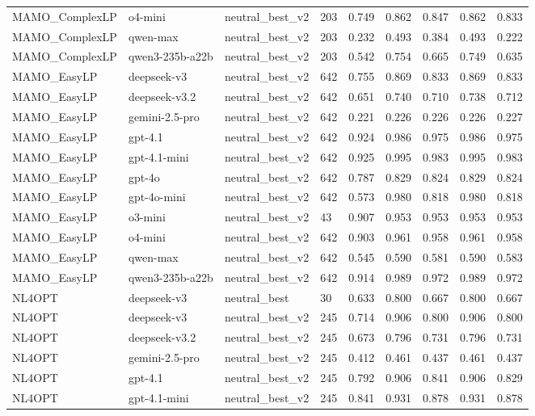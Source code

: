 \begin{table}[t]
\begin{tabular}{lllllllll}
MAMO\_ComplexLP & o4-mini & neutral\_best\_v2 & 203 & 0.749 & 0.862 & 0.847 & 0.862 & 0.833 \\
MAMO\_ComplexLP & qwen-max & neutral\_best\_v2 & 203 & 0.232 & 0.493 & 0.384 & 0.493 & 0.222 \\
MAMO\_ComplexLP & qwen3-235b-a22b & neutral\_best\_v2 & 203 & 0.542 & 0.754 & 0.665 & 0.749 & 0.635 \\
MAMO\_EasyLP & deepseek-v3 & neutral\_best\_v2 & 642 & 0.755 & 0.869 & 0.833 & 0.869 & 0.833 \\
MAMO\_EasyLP & deepseek-v3.2 & neutral\_best\_v2 & 642 & 0.651 & 0.740 & 0.710 & 0.738 & 0.712 \\
MAMO\_EasyLP & gemini-2.5-pro & neutral\_best\_v2 & 642 & 0.221 & 0.226 & 0.226 & 0.226 & 0.227 \\
MAMO\_EasyLP & gpt-4.1 & neutral\_best\_v2 & 642 & 0.924 & 0.986 & 0.975 & 0.986 & 0.975 \\
MAMO\_EasyLP & gpt-4.1-mini & neutral\_best\_v2 & 642 & 0.925 & 0.995 & 0.983 & 0.995 & 0.983 \\
MAMO\_EasyLP & gpt-4o & neutral\_best\_v2 & 642 & 0.787 & 0.829 & 0.824 & 0.829 & 0.824 \\
MAMO\_EasyLP & gpt-4o-mini & neutral\_best\_v2 & 642 & 0.573 & 0.980 & 0.818 & 0.980 & 0.818 \\
MAMO\_EasyLP & o3-mini & neutral\_best\_v2 & 43 & 0.907 & 0.953 & 0.953 & 0.953 & 0.953 \\
MAMO\_EasyLP & o4-mini & neutral\_best\_v2 & 642 & 0.903 & 0.961 & 0.958 & 0.961 & 0.958 \\
MAMO\_EasyLP & qwen-max & neutral\_best\_v2 & 642 & 0.545 & 0.590 & 0.581 & 0.590 & 0.583 \\
MAMO\_EasyLP & qwen3-235b-a22b & neutral\_best\_v2 & 642 & 0.914 & 0.989 & 0.972 & 0.989 & 0.972 \\
NL4OPT & deepseek-v3 & neutral\_best & 30 & 0.633 & 0.800 & 0.667 & 0.800 & 0.667 \\
NL4OPT & deepseek-v3 & neutral\_best\_v2 & 245 & 0.714 & 0.906 & 0.800 & 0.906 & 0.800 \\
NL4OPT & deepseek-v3.2 & neutral\_best\_v2 & 245 & 0.673 & 0.796 & 0.731 & 0.796 & 0.731 \\
NL4OPT & gemini-2.5-pro & neutral\_best\_v2 & 245 & 0.412 & 0.461 & 0.437 & 0.461 & 0.437 \\
NL4OPT & gpt-4.1 & neutral\_best\_v2 & 245 & 0.792 & 0.906 & 0.841 & 0.906 & 0.829 \\
NL4OPT & gpt-4.1-mini & neutral\_best\_v2 & 245 & 0.841 & 0.931 & 0.878 & 0.931 & 0.878 \\

\end{tabular}
\end{table}
